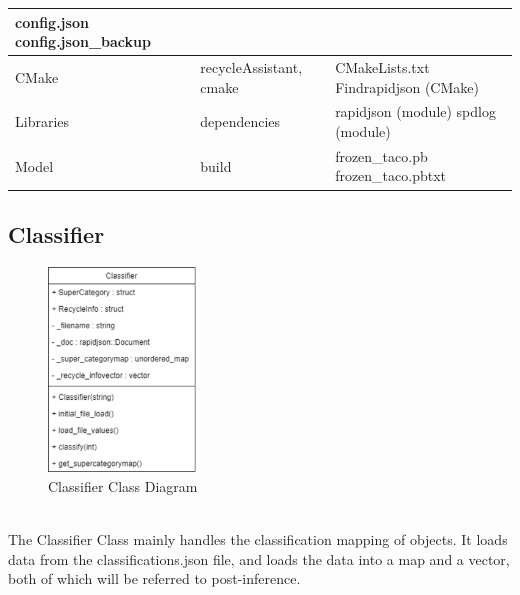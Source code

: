 \documentclass[conference]{IEEEtran}
\begin{document}
\begin{table}[htbp!]
\begin{center}
\begin{tabular}{|p{1.5cm}|p{2.2cm}|p{3.9cm}|}
\newline
config.json
\newline
config.json\_backup
\newline
\\ \hline
CMake & recycleAssistant, cmake & CMakeLists.txt
\newline
\newline
Findrapidjson (CMake)
\newline
\\ \hline
Libraries & dependencies & rapidjson (module)
\newline
\newline
spdlog (module)
\newline
\\ \hline
Model & build &
frozen\_taco.pb
\newline
frozen\_taco.pbtxt
\newline
\\ \hline
\end{tabular}
\label{tab1}
\end{center}
\end{table}


\subsection{Classifier}

\begin{figure}[h]
    \centering
    \includegraphics[width=0.35\textwidth]{images/code_diagrams/classifier_uml.eps}
    \caption{Classifier Class Diagram}
\end{figure}~\\

The Classifier Class mainly handles the classification mapping of objects. It loads data from the classifications.json file, and loads the data into a map and a vector, both of which will be referred to post-inference.\\
\end{document}
